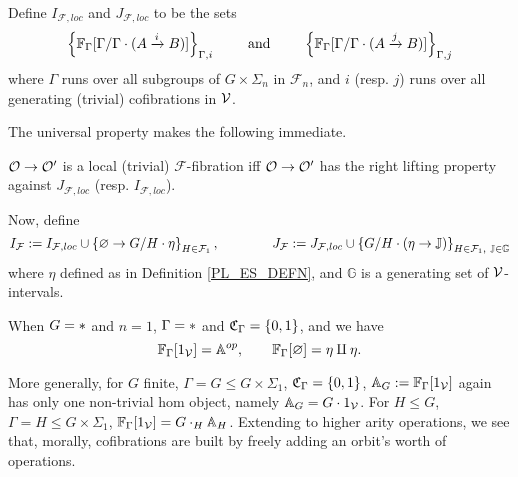 \documentclass[a4paper,10pt
,draft
]{article}%
\renewcommand{\F}{\mathcal F}
\newcommand{\J}{\mathbb J}
\renewcommand{\1}{\eta}%
\begin{document}
Define $I_{\F,loc}$ and $J_{\F, loc}$ to be the sets
\begin{align*}
  \left\{\mathbb F_\Gamma[\Gamma/\Gamma \cdot (A \xrightarrow{i} B)]\right\}_{\Gamma, i}
  \qquad \mbox{ and } \qquad
  \left\{\mathbb F_\Gamma[\Gamma/\Gamma \cdot (A \xrightarrow{j} B)]\right\}_{\Gamma,j}
\end{align*}
where $\Gamma$ runs over all subgroups of $G \times \Sigma_n$ in $\F_n$,
and $i$ (resp. $j$) runs over all generating (trivial) cofibrations in $\mathcal V$.

The universal property makes the following immediate.
\begin{corollary}
      $\mathcal{O} \to \mathcal{O}'$ is a local (trivial) $\F$-fibration iff
      $\mathcal{O} \to \mathcal{O}'$ has the right lifting property against $J_{\F, loc}$ (resp. $I_{\F, loc}$).
\end{corollary}

Now, define
\begin{equation}
      \label{IFJF_EQ}
      I_{\F}:= I_{\F, loc} \mathbin{\cup} \set{\varnothing \to G/H \cdot \1}_{H \in \F_1},
      \qquad \qquad
      J_{\F} := J_{\F, loc} \mathbin{\cup} \set{G/H \cdot (\1 \to \J)}_{H \in \F_1,\ \J\in\mathbb{G}}
\end{equation}
where $\1$ defined as in Definition \ref{PL_ES_DEFN}, and $\mathbb{G}$ is a generating set of $\mathcal V$-intervals. 


\begin{example}
      When $G = \**$ and $n=1$, $\Gamma = \**$ and $\mathfrak C_\Gamma = \left\{0,1\right\}$, and we have
      \[
            \mathbb F_{\Gamma}[1_{\mathcal V}] = \mathbb A^{op}, \qquad \mathbb F_{\Gamma}[\varnothing] = \eta \amalg \eta.
      \]

      More generally, for $G$ finite, $\Gamma = G \leq G \times \Sigma_1$, $\mathfrak C_\Gamma = \left\{0,1\right\}$,
      $\mathbb A_G := \mathbb F_{\Gamma}[1_{\mathcal V}]$ again has only one non-trivial hom object, namely
      $\mathbb A_G = G \cdot 1_{\mathcal V}$.
      For $H \leq G$, $\Gamma = H \leq G \times \Sigma_1$, $\mathbb F_{\Gamma}[1_{\mathcal V}] = G \cdot_H \mathbb A_H$.
      Extending to higher arity operations, we see that,
      morally, cofibrations are built by freely adding an orbit's worth of operations.
\end{example}
\end{document}
